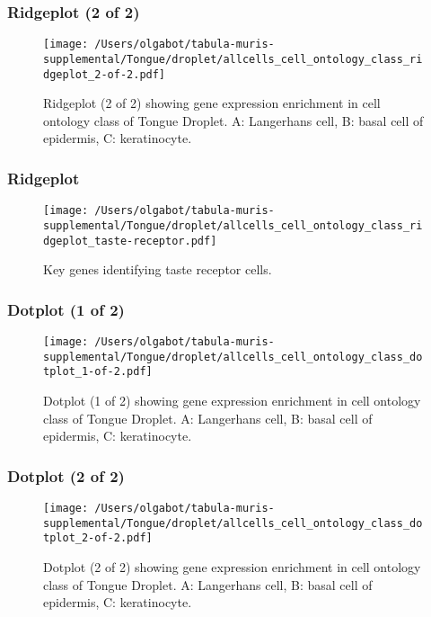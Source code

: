 \clearpage
\clearpage
\subsubsection{Ridgeplot (2 of 2)}
\begin{figure}[h]
\centering
\texttt{[image: /Users/olgabot/tabula-muris-supplemental/Tongue/droplet/allcells\_cell\_ontology\_class\_ridgeplot\_2-of-2.pdf]}

\caption{ Ridgeplot (2 of 2)  showing gene expression enrichment in cell ontology class of Tongue Droplet. A: Langerhans cell, B: basal cell of epidermis, C: keratinocyte.}
\end{figure}


\clearpage
\clearpage
\subsubsection{Ridgeplot}
\begin{figure}[h]
\centering
\texttt{[image: /Users/olgabot/tabula-muris-supplemental/Tongue/droplet/allcells\_cell\_ontology\_class\_ridgeplot\_taste-receptor.pdf]}

\caption{Key genes identifying taste receptor cells.
}
\end{figure}


\clearpage
\clearpage
\subsubsection{Dotplot (1 of 2)}
\begin{figure}[h]
\centering
\texttt{[image: /Users/olgabot/tabula-muris-supplemental/Tongue/droplet/allcells\_cell\_ontology\_class\_dotplot\_1-of-2.pdf]}

\caption{ Dotplot (1 of 2)  showing gene expression enrichment in cell ontology class of Tongue Droplet. A: Langerhans cell, B: basal cell of epidermis, C: keratinocyte.}
\end{figure}


\clearpage
\clearpage
\subsubsection{Dotplot (2 of 2)}
\begin{figure}[h]
\centering
\texttt{[image: /Users/olgabot/tabula-muris-supplemental/Tongue/droplet/allcells\_cell\_ontology\_class\_dotplot\_2-of-2.pdf]}

\caption{ Dotplot (2 of 2)  showing gene expression enrichment in cell ontology class of Tongue Droplet. A: Langerhans cell, B: basal cell of epidermis, C: keratinocyte.}
\end{figure}


